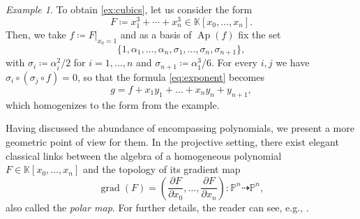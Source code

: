 \documentclass[a4paper,11pt,reqno]{amsart}
\newcommand{\bbK}{\mathbb{K}}
\newcommand{\dashto}{\dashrightarrow}
\DeclareMathOperator{\Ap}{Ap}
\numberwithin{equation}{section}
\theoremstyle{definition}
\theoremstyle{plain}
\theoremstyle{remark}
\newtheorem{exam}[defn]{Example}
\DeclareMathOperator{\grad}{grad}
\begin{document}
\begin{exam}
    To obtain \autoref{ex:cubics}, let us consider the form
    \[ F \coloneq x_1^3 + \cdots + x_n^3\in
    \bbK[x_0, \ldots ,x_n].\] Then, we take $f \coloneq F|_{x_0=1}$ and
    as a basis of $\Ap(f)$ fix the set
\[
\{1,\alpha_1,\dots,\alpha_n,\sigma_1,\dots,\sigma_n,\sigma_{n+1}\},
\]
with $\sigma_i \coloneq \alpha_i^2/2$ for $i=1, \ldots , n$ and
    $\sigma_{n+1} \coloneq \alpha_1^3/6$.
    For every $i,j$ we have $\sigma_i\circ (\sigma_j \circ f) = 0$, so that
    the formula \eqref{eq:exponent} becomes
    \[
      g =  f + x_1y_1 +  \ldots + x_ny_n + y_{n+1},
    \]
    which homogenizes to the form from the example.
\end{exam}


Having discussed the abundance of encompassing polynomials, we present a more geometric point of view for them.
In the projective setting, there exist elegant classical links between the algebra of
a homogeneous polynomial $F\in \bbK[x_0, \ldots ,x_n]$ and the topology of its
gradient map
\[
    \grad(F) = \left( \frac{\partial F}{\partial x_0},  \ldots ,
    \frac{\partial F}{\partial x_n} \right) \colon \mathbb{P}^{n}\dashto \mathbb{P}^{n},
\]
also called the \textit{polar map}. For further details, the reader can see, e.g., \cites{huh2012milnor, DP03, Dol00,
HKS92}.
\end{document}

